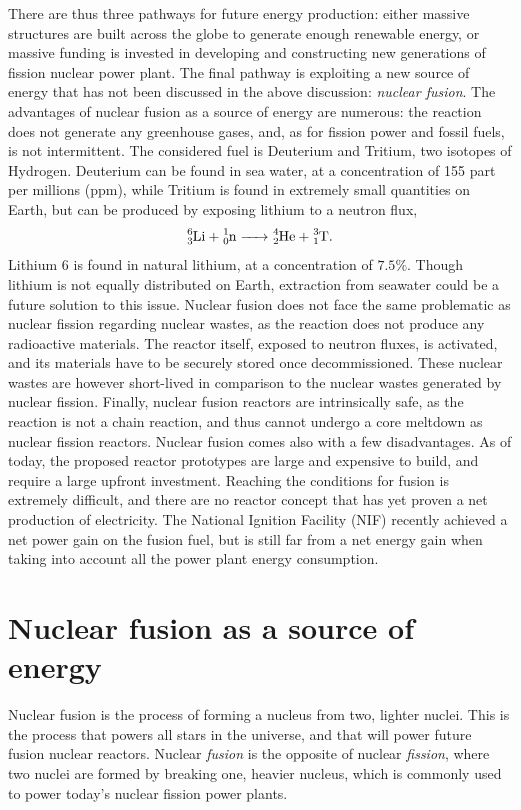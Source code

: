 \documentclass[my_thesis.tex]{subfiles}
\begin{document}
There are thus three pathways for future energy production: either massive structures are built across the globe to generate enough renewable energy, or massive funding is invested in developing and constructing new generations of fission nuclear power plant. The final pathway is exploiting a new source of energy that has not been discussed in the above discussion: \emph{nuclear fusion}. The advantages of nuclear fusion as a source of energy are numerous: the reaction does not generate any greenhouse gases, and, as for fission power and fossil fuels, is not intermittent. The considered fuel is Deuterium and Tritium, two isotopes of Hydrogen. Deuterium can be found in sea water, at a concentration of 155 part per millions (ppm), while Tritium is found in extremely small quantities on Earth, but can be produced by exposing lithium to a neutron flux,
\begin{equation}
    \ce{^{6}_{3}Li + ^{1}_{0}n -> ^{4}_{2}He + ^{3}_{1}T}.
\end{equation}
Lithium 6 is found in natural lithium, at a concentration of $7.5\%$. Though lithium is not equally distributed on Earth, extraction from seawater \citep{ZHAO2019113389} could be a future solution to this issue. Nuclear fusion does not face the same problematic as nuclear fission regarding nuclear wastes, as the reaction does not produce any radioactive materials. The reactor itself, exposed to neutron fluxes, is activated, and its materials have to be securely stored once decommissioned. These nuclear wastes are however short-lived in comparison to the nuclear wastes generated by nuclear fission. Finally, nuclear fusion reactors are intrinsically safe, as the reaction is not a chain reaction, and thus cannot undergo a core meltdown as nuclear fission reactors. Nuclear fusion comes also with a few disadvantages. As of today, the proposed reactor prototypes are large and expensive to build, and require a large upfront investment. Reaching the conditions for fusion is extremely difficult, and there are no reactor concept that has yet proven a net production of electricity. The National Ignition Facility (NIF) recently achieved a net power gain \citep{NationalIgnitionFacility} on the fusion fuel, but is still far from a net energy gain when taking into account all the power plant energy consumption.

\section{Nuclear fusion as a source of energy}
Nuclear fusion is the process of forming a nucleus from two, lighter nuclei. This is the process that powers all stars in the universe, and that will power future fusion nuclear reactors. Nuclear \emph{fusion} is the opposite of nuclear \emph{fission}, where two nuclei are formed by breaking one, heavier nucleus, which is commonly used to power today's nuclear fission power plants.
\end{document}

